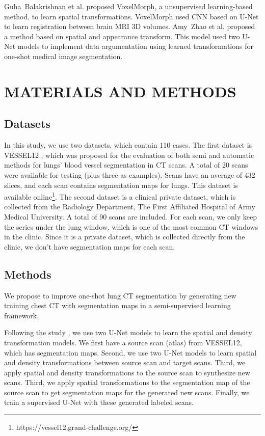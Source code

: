 \documentclass{article}
\begin{document}
Guha~Balakrishnan et al. \cite{balakrishnan2019tmi} proposed VoxelMorph, a unsupervised learning-based method, to learn spatial transformations. VoxelMorph used CNN based on U-Net to learn registration between brain MRI 3D volumes. Amy~Zhao et al. \cite{zhao2019data} proposed a method based on spatial and appearance transform. This model used two U-Net models to implement data argumentation using learned transformations for one-shot medical image segmentation. 

\section{MATERIALS AND METHODS}
\label{sec:materials}

\subsection{Datasets}
\label{dataset}
In this study, we use two datasets, which contain 110 cases.
The first dataset is VESSEL12 \cite{rudyanto2014comparing}, which was proposed for the evaluation of both semi and automatic methods for lungs’ blood vessel segmentation in CT scans. A total of 20 scans were available for testing (plus three as examples). Scans have an average of 432 slices, and each scan contains segmentation maps for lungs. This dataset is available online\footnote{https://vessel12.grand-challenge.org/}.
The second dataset is a clinical private dataset, which is collected from the Radiology Department, The First Affiliated Hospital of Army Medical University. A total of 90 scans are included. For each scan, we only keep the series under the lung window, which is one of the most common CT windows in the clinic. Since it is a private dataset, which is collected directly from the clinic, we don't have segmentation maps for each scan. 

\subsection{Methods}
\label{methods}
We propose to improve one-shot lung CT segmentation by generating new training chest CT with segmentation maps in a semi-supervised learning framework.

Following the study \cite{zhao2019data}, we use two U-Net models to learn the spatial and density transformation models. 
We first have a source scan (atlas) from VESSEL12, which has segmentation maps. Second, we use two U-Net models to learn spatial and density transformations between source scan and target scans. Third, we apply spatial and density transformations to the source scan to synthesize new scans. Third, we apply spatial transformations to the segmentation map of the source scan to get segmentation maps for the generated new scans. Finally, we train a supervised U-Net with these generated labeled scans.
\end{document}
